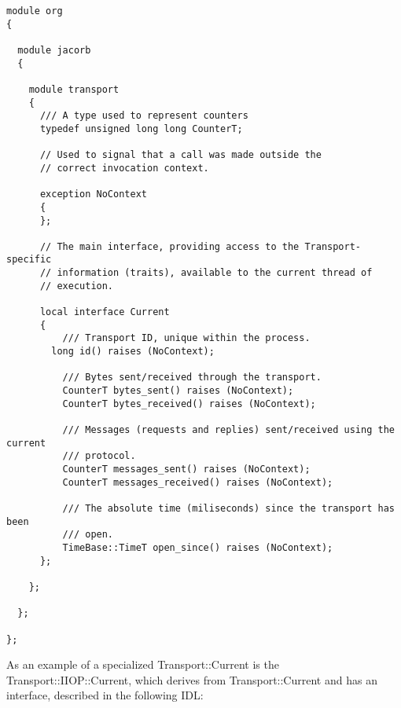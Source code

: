 \begin{verbatim}
module org
{

  module jacorb
  {

    module transport
    {
      /// A type used to represent counters
      typedef unsigned long long CounterT;

      // Used to signal that a call was made outside the
      // correct invocation context.

      exception NoContext
      {
      };

      // The main interface, providing access to the Transport-specific
      // information (traits), available to the current thread of
      // execution.

      local interface Current
      {
          /// Transport ID, unique within the process.
        long id() raises (NoContext);

          /// Bytes sent/received through the transport.
          CounterT bytes_sent() raises (NoContext);
          CounterT bytes_received() raises (NoContext);

          /// Messages (requests and replies) sent/received using the current
          /// protocol.
          CounterT messages_sent() raises (NoContext);
          CounterT messages_received() raises (NoContext);

          /// The absolute time (miliseconds) since the transport has been
          /// open.
          TimeBase::TimeT open_since() raises (NoContext);
      };

    };

  };

};
\end{verbatim}

As an example of a specialized Transport::Current is the Transport::IIOP::Current,
which derives from Transport::Current and has an interface, described in the following IDL:


